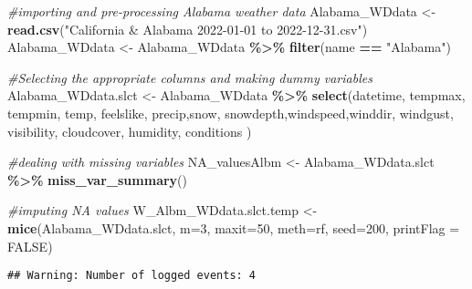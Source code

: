 \documentclass[
]{article}
\newenvironment{Shaded}{\begin{snugshade}}{\end{snugshade}}
\newcommand{\AttributeTok}[1]{\textcolor[rgb]{0.13,0.29,0.53}{#1}}
\newcommand{\CommentTok}[1]{\textcolor[rgb]{0.56,0.35,0.01}{\textit{#1}}}
\newcommand{\ConstantTok}[1]{\textcolor[rgb]{0.56,0.35,0.01}{#1}}
\newcommand{\DecValTok}[1]{\textcolor[rgb]{0.00,0.00,0.81}{#1}}
\newcommand{\FunctionTok}[1]{\textcolor[rgb]{0.13,0.29,0.53}{\textbf{#1}}}
\newcommand{\NormalTok}[1]{#1}
\newcommand{\OtherTok}[1]{\textcolor[rgb]{0.56,0.35,0.01}{#1}}
\newcommand{\SpecialCharTok}[1]{\textcolor[rgb]{0.81,0.36,0.00}{\textbf{#1}}}
\newcommand{\StringTok}[1]{\textcolor[rgb]{0.31,0.60,0.02}{#1}}
\begin{document}
\begin{Shaded}
\begin{Highlighting}[]
\CommentTok{\#importing and pre{-}processing Alabama  weather data }
\NormalTok{Alabama\_WDdata }\OtherTok{\textless{}{-}} \FunctionTok{read.csv}\NormalTok{(}\StringTok{"California \& Alabama 2022{-}01{-}01 to 2022{-}12{-}31.csv"}\NormalTok{)}
\NormalTok{Alabama\_WDdata }\OtherTok{\textless{}{-}}\NormalTok{  Alabama\_WDdata }\SpecialCharTok{\%\textgreater{}\%}
  \FunctionTok{filter}\NormalTok{(name }\SpecialCharTok{==} \StringTok{"Alabama"}\NormalTok{)}

\CommentTok{\#Selecting the appropriate columns and making dummy variables }
\NormalTok{Alabama\_WDdata.slct }\OtherTok{\textless{}{-}}\NormalTok{ Alabama\_WDdata }\SpecialCharTok{\%\textgreater{}\%}
  \FunctionTok{select}\NormalTok{(datetime, tempmax, tempmin, temp, }
\NormalTok{          feelslike, precip,snow, snowdepth,windspeed,winddir, }
\NormalTok{          windgust, visibility, cloudcover, humidity, conditions )}

\CommentTok{\#dealing with missing variables}
\NormalTok{NA\_valuesAlbm }\OtherTok{\textless{}{-}}\NormalTok{ Alabama\_WDdata.slct }\SpecialCharTok{\%\textgreater{}\%}
  \FunctionTok{miss\_var\_summary}\NormalTok{()}

\CommentTok{\#imputing NA values}
\NormalTok{W\_Albm\_WDdata.slct.temp }\OtherTok{\textless{}{-}} \FunctionTok{mice}\NormalTok{(Alabama\_WDdata.slct,}
                                \AttributeTok{m=}\DecValTok{3}\NormalTok{, }
                                \AttributeTok{maxit=}\DecValTok{50}\NormalTok{, }
                                \AttributeTok{meth=}\StringTok{\textquotesingle{}rf\textquotesingle{}}\NormalTok{, }
                                \AttributeTok{seed=}\DecValTok{200}\NormalTok{, }
                                \AttributeTok{printFlag =} \ConstantTok{FALSE}\NormalTok{)}
\end{Highlighting}
\end{Shaded}

\begin{verbatim}
## Warning: Number of logged events: 4
\end{verbatim}
\end{document}
